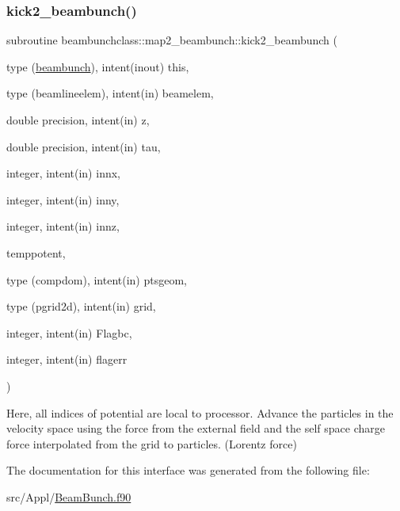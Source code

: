\subsubsection{\texorpdfstring{kick2\_beambunch()}{kick2\_beambunch()}}
{\footnotesize\ttfamily subroutine beambunchclass\+::map2\+\_\+beambunch\+::kick2\+\_\+beambunch (\begin{DoxyParamCaption}\item[{type (\mbox{\hyperlink{namespacebeambunchclass_structbeambunchclass_1_1beambunch}{beambunch}}), intent(inout)}]{this,  }\item[{type (beamlineelem), intent(in)}]{beamelem,  }\item[{double precision, intent(in)}]{z,  }\item[{double precision, intent(in)}]{tau,  }\item[{integer, intent(in)}]{innx,  }\item[{integer, intent(in)}]{inny,  }\item[{integer, intent(in)}]{innz,  }\item[{}]{temppotent,  }\item[{type (compdom), intent(in)}]{ptsgeom,  }\item[{type (pgrid2d), intent(in)}]{grid,  }\item[{integer, intent(in)}]{Flagbc,  }\item[{integer, intent(in)}]{flagerr }\end{DoxyParamCaption})}



Here, all indices of potential are local to processor. Advance the particles in the velocity space using the force from the external field and the self space charge force interpolated from the grid to particles. (Lorentz force) 



The documentation for this interface was generated from the following file\+:\begin{DoxyCompactItemize}
\item 
src/\+Appl/\mbox{\hyperlink{_beam_bunch_8f90}{Beam\+Bunch.\+f90}}\end{DoxyCompactItemize}

